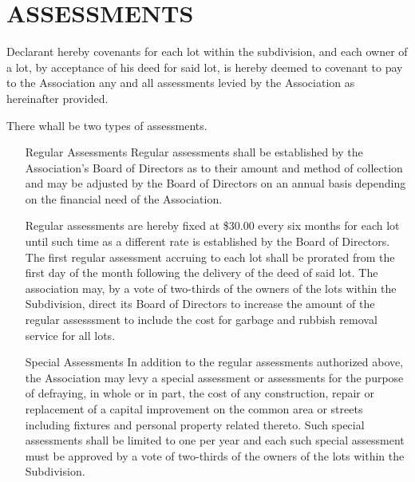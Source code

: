 \documentclass[12pt, letterpaper]{article}
\begin{document}
\section{ASSESSMENTS}
Declarant hereby covenants for each lot within the subdivision, and each owner of a lot, by acceptance of his deed for said lot, is hereby deemed to covenant to pay to the Association any and all assessments levied by the Association as hereinafter provided.

There whall be two types of assessments.

\begin{enumerate}
\item[Regular Assessments] Regular assessments shall be established by the Association's Board of Directors as to their amount and method of collection and may be adjusted by the Board of Directors on an annual basis depending on the financial need of the Association.

Regular assessments are hereby fixed at \$30.00 every six months for each lot until such time as a different rate is established by the Board of Directors.
The first regular assessment accruing to each lot shall be prorated from the first day of the month following the delivery of the deed of said lot.
The association may, by a vote of two-thirds of the owners of the lots within the Subdivision, direct its Board of Directors to increase the amount of the regular assesssment to include the cost for garbage and rubbish removal service for all lots.
\item[Special Assessments] In addition to the regular assessments authorized above, the Association may levy a special assessment or assessments for the purpose of defraying, in whole or in part, the cost of any construction, repair or replacement of a capital improvement on the common area or streets including fixtures and personal property related thereto.
Such special assessments shall be limited to one per year and each such special assessment must be approved by a vote of two-thirds of the owners of the lots within the Subdivision.


\end{enumerate}
\end{document}
